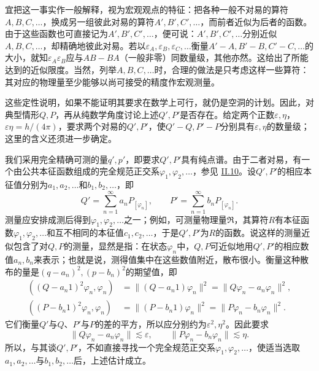 \documentclass[fontsize=13pt,twoside,openany,headings=normal,parskip=false,bookmarkpackage=false,DIV=calc]{scrbook}
\begin{document}
宜把这一事实作一般解释，视为宏观观点的特征：把各种一般不对易的算符$A,\allowbreak B,\allowbreak C,\allowbreak \ldots$，换成另一组彼此对易的算符$A',\allowbreak B',\allowbreak C',\allowbreak \ldots$，而前者近似为后者的函数。由于这些函数也可直接记为$A',\allowbreak B',\allowbreak C',\allowbreak \ldots$，便可说：$A',\allowbreak B',\allowbreak C',\allowbreak \ldots$分别近似$A,\allowbreak B,\allowbreak C,\allowbreak \ldots$，却精确地彼此对易。若以$\varepsilon_A,\allowbreak \varepsilon_B,\allowbreak \varepsilon_C,\allowbreak \ldots$衡量$A'-A,\allowbreak B'-B,\allowbreak C'-C,\allowbreak \ldots$的大小，就知$\varepsilon_A\varepsilon_B$应与$AB-BA$（一般非零）同数量级，其他亦然。这给出了所能达到的近似限度。当然，列举$A,\allowbreak B,\allowbreak C,\allowbreak \ldots$时，合理的做法是只考虑这样一些算符：其对应的物理量至少能够以尚可接受的精度作宏观测量。

这些定性说明，如果不能证明其要求在数学上\hypertarget{origpage-216}{}\label{origpage-216}可行，就仍是空洞的计划。因此，对典型情形$Q,\allowbreak P$，再从纯数学角度讨论上述$Q',\allowbreak P'$是否存在。给定两个正数$\varepsilon,\allowbreak \eta$，$\varepsilon\eta=h/(4\pi)$，要求两个对易的$Q',\allowbreak P'$，使$Q'-Q,\allowbreak P'-P$分别具有$\varepsilon,\allowbreak \eta$的数量级；这里的含义还须进一步确定。

我们采用完全精确可测的量$q',\allowbreak p'$，即要求$Q',\allowbreak P'$具有纯点谱。由于二者对易，有一个由公共本征函数组成的完全规范正交系$\varphi_1,\allowbreak \varphi_2,\allowbreak \ldots$，参见 \hyperref[sec:II.10]{II.10}。设$Q',\allowbreak P'$的相应本征值分别为$a_1,\allowbreak a_2,\allowbreak \ldots$和$b_1,\allowbreak b_2,\allowbreak \ldots$，即
\[
Q'=\sum_{n=1}^{\infty}a_nP_{[\varphi_n]},\qquad
P'=\sum_{n=1}^{\infty}b_nP_{[\varphi_n]}.
\]
测量应安排成测后得到$\varphi_1,\allowbreak \varphi_2,\allowbreak \ldots$之一；例如，可测量物理量$\mathfrak R$，其算符$R$有本征函数$\varphi_1,\allowbreak \varphi_2,\allowbreak \ldots$和互不相同的本征值$c_1,\allowbreak c_2,\allowbreak \ldots$，于是$Q',\allowbreak P'$为$R$的函数。说这样的测量近似包含了对$Q,\allowbreak P$的测量，显然是指：在状态$\varphi_n$中，$Q,\allowbreak P$可近似地用$Q',\allowbreak P'$的相应数值$a_n,\allowbreak b_n$来表示；也就是说，测得值集中在这些数值附近，散布很小。衡量这种散布的量是$(q-a_n)^2,\allowbreak (p-b_n)^2$的期望值，即
\begin{align*}
((Q-a_n1)^2\varphi_n,\varphi_n)&=\|(Q-a_n1)\varphi_n\|^2=\|Q\varphi_n-a_n\varphi_n\|^2,\\
((P-b_n1)^2\varphi_n,\varphi_n)&=\|(P-b_n1)\varphi_n\|^2=\|P\varphi_n-b_n\varphi_n\|^2.
\end{align*}
它们衡量$Q'$与$Q$、$P'$与$P$的差的平方，所以应分别约为$\varepsilon^2,\allowbreak \eta^2$。因此要求
\[
\|Q\varphi_n-a_n\varphi_n\|\lesssim\varepsilon,\qquad
\|P\varphi_n-b_n\varphi_n\|\lesssim\eta.
\]
所以，与其谈$Q',\allowbreak P'$，不如直接寻找一个完全规范正交系$\varphi_1,\allowbreak \varphi_2,\allowbreak \ldots$，使适当选取$a_1,\allowbreak a_2,\allowbreak \ldots$与$b_1,\allowbreak b_2,\allowbreak \ldots$后，上述估计成立。
\end{document}
